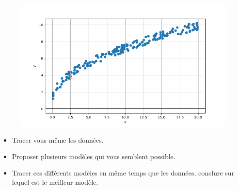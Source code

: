 \documentclass[11pt, french]{article}
\begin{document}
\begin{figure}[!h]
    \center
    \includegraphics[scale=0.7]{assets/serie_2_exo_3_figure_6.png}
    \label{fig:p_s_2_exo3-fig1}
\end{figure}

\begin{itemize}
    \item Tracer vous même les données.
    \item Proposer plusieurs modèles qui vous semblent possible.
    \item Tracer ces différents modèles en même temps que les données, conclure sur lequel est le meilleur modèle.
\end{itemize}


\end{document}
